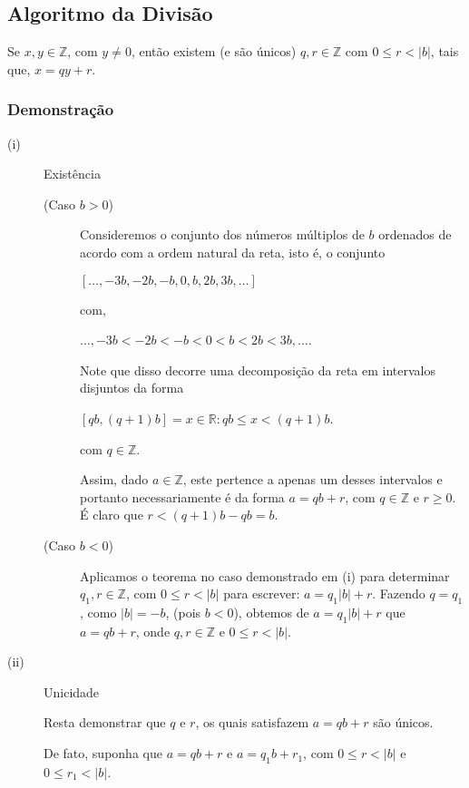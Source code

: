 \subsection*{Algoritmo da Divisão}
Se $x, y \in \mathbb{Z}$, com $y \neq 0$, então existem (e são únicos) $q, r \in  \mathbb{Z}$ com $0 \leq r < |b|$, tais que, $x = qy + r$.
\subsubsection*{Demonstração}
\begin{description}
    \item[(i)] Existência \newline
    \begin{description}
        \item[(Caso $b > 0$)]
        Consideremos o conjunto dos números múltiplos de $b$ ordenados de acordo com a ordem natural da reta, isto é, o conjunto

        $[\dots, -3b, -2b, -b, 0, b, 2b, 3b, \dots]$

        com,

        $\dots, -3b < -2b < -b < 0 < b < 2b < 3b, \dots$.

        Note que disso decorre uma decomposição da reta em intervalos disjuntos da forma

        $[qb, (q + 1)b] = {x \in \mathbb{R} : qb \leq x < (q + 1)b}$.

        com $q \in \mathbb{Z}$.

        Assim, dado $a \in \mathbb{Z}$, este pertence a apenas um desses intervalos e portanto necessariamente é da forma $a = qb + r$, com $q \in \mathbb{Z}$ e $r \geq 0$. É claro que $r < (q + 1)b - qb = b$.

        \item[(Caso $b < 0$)]
        Aplicamos o teorema no caso demonstrado em (i) para determinar $q_1, r \in \mathbb{Z}$, com $0 \leq r < |b|$ para escrever: $a = q_1|b| + r$. Fazendo $q = q_1$, como $|b| = -b$, (pois $b < 0$), obtemos de $a = q_1|b| + r$ que $a = qb + r$, onde $q, r \in \mathbb{Z}$ e $0 \leq r < |b|$.
    \end{description}
    \item[(ii)] Unicidade

    Resta demonstrar que $q$ e $r$, os quais satisfazem $a = qb + r$ são únicos.

    De fato, suponha que $a = qb + r$ e $a = q_1 b + r_1$, com $0 \leq r < |b|$ e $0 \leq r_1 < |b|$.


\end{description}

